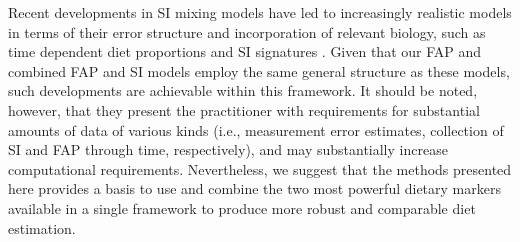 \documentclass{article}%
\begin{document}
\begin{spacing}{1.9}
\begin{flushleft}
Recent developments in SI mixing models have led to increasingly
realistic models in terms of their error structure \citep{hopkins_estimating_2012} and
incorporation of relevant biology, such as time dependent diet
proportions and SI signatures \citep{parnell_bayesian_2012}. Given that our FAP and combined
FAP and SI models employ the same general structure as these models,
such developments are achievable within this framework. It should be
noted, however, that they present the practitioner with requirements for substantial
amounts of data of various kinds (i.e., measurement error estimates,
collection of SI and FAP through time, respectively), and may
substantially increase computational requirements. Nevertheless, we
suggest that the methods presented here provides a basis to use and
combine the two most powerful dietary markers available in
a single framework to produce more robust and comparable diet estimation.

\printbibliography%
\end{flushleft}
\end{spacing}
\end{document}
